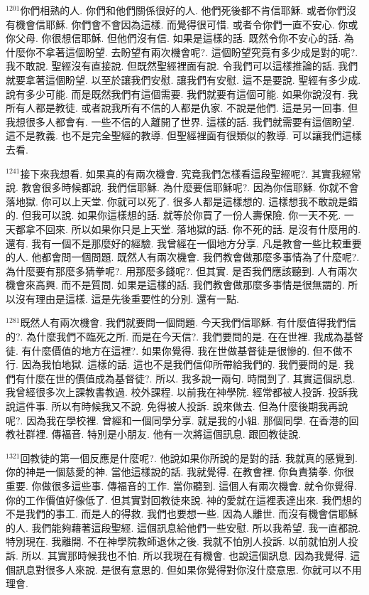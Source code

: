 \documentclass{book}
\begin{document}
$^{1201}$你們相熟的人.
你們和他們關係很好的人.
他們死後都不肯信耶穌.
或者你們沒有機會信耶穌.
你們會不會因為這樣.
而覺得很可惜.
或者令你們一直不安心.
你或你父母.
你很想信耶穌.
但他們沒有信.
如果是這樣的話.
既然令你不安心的話.
為什麼你不拿著這個盼望.
去盼望有兩次機會呢?.
這個盼望究竟有多少成是對的呢?.
我不敢說.
聖經沒有直接說.
但既然聖經裡面有說.
令我們可以這樣推論的話.
我們就要拿著這個盼望.
以至於讓我們安慰.
讓我們有安慰.
這不是要說.
聖經有多少成.
說有多少可能.
而是既然我們有這個需要.
我們就要有這個可能.
如果你說沒有.
我所有人都是教徒.
或者說我所有不信的人都是仇家.
不說是他們.
這是另一回事.
但我想很多人都會有.
一些不信的人離開了世界.
這樣的話.
我們就需要有這個盼望.
這不是教義.
也不是完全聖經的教導.
但聖經裡面有很類似的教導.
可以讓我們這樣去看.

$^{1241}$接下來我想看.
如果真的有兩次機會.
究竟我們怎樣看這段聖經呢?.
其實我經常說.
教會很多時候都說.
我們信耶穌.
為什麼要信耶穌呢?.
因為你信耶穌.
你就不會落地獄.
你可以上天堂.
你就可以死了.
很多人都是這樣想的.
這樣想我不敢說是錯的.
但我可以說.
如果你這樣想的話.
就等於你買了一份人壽保險.
你一天不死.
一天都拿不回來.
所以如果你只是上天堂.
落地獄的話.
你不死的話.
是沒有什麼用的.
還有.
我有一個不是那麼好的經驗.
我曾經在一個地方分享.
凡是教會一些比較重要的人.
他都會問一個問題.
既然人有兩次機會.
我們教會做那麼多事情為了什麼呢?.
為什麼要有那麼多猜拳呢?.
用那麼多錢呢?.
但其實.
是否我們應該聽到.
人有兩次機會來高興.
而不是質問.
如果是這樣的話.
我們教會做那麼多事情是很無謂的.
所以沒有理由是這樣.
這是先後重要性的分別.
還有一點.

$^{1281}$既然人有兩次機會.
我們就要問一個問題.
今天我們信耶穌.
有什麼值得我們信的?.
為什麼我們不臨死之所.
而是在今天信?.
我們要問的是.
在在世裡.
我成為基督徒.
有什麼價值的地方在這裡?.
如果你覺得.
我在世做基督徒是很慘的.
但不做不行.
因為我怕地獄.
這樣的話.
這也不是我們信仰所帶給我們的.
我們要問的是.
我們有什麼在世的價值成為基督徒?.
所以.
我多說一兩句.
時間到了.
其實這個訊息.
我曾經很多次上課教書教過.
校外課程.
以前我在神學院.
經常都被人投訴.
投訴我說這件事.
所以有時候我又不說.
免得被人投訴.
說來做去.
但為什麼後期我再說呢?.
因為我在學校裡.
曾經和一個同學分享.
就是我的小組.
那個同學.
在香港的回教社群裡.
傳福音.
特別是小朋友.
他有一次將這個訊息.
跟回教徒說.

$^{1321}$回教徒的第一個反應是什麼呢?.
他說如果你所說的是對的話.
我就真的感覺到.
你的神是一個慈愛的神.
當他這樣說的話.
我就覺得.
在教會裡.
你負責猜拳.
你很重要.
你做很多這些事.
傳福音的工作.
當你聽到.
這個人有兩次機會.
就令你覺得.
你的工作價值好像低了.
但其實對回教徒來說.
神的愛就在這裡表達出來.
我們想的不是我們的事工.
而是人的得救.
我們也要想一些.
因為人離世.
而沒有機會信耶穌的人.
我們能夠藉著這段聖經.
這個訊息給他們一些安慰.
所以我希望.
我一直都說.
特別現在.
我離開.
不在神學院教師退休之後.
我就不怕別人投訴.
以前就怕別人投訴.
所以.
其實那時候我也不怕.
所以我現在有機會.
也說這個訊息.
因為我覺得.
這個訊息對很多人來說.
是很有意思的.
但如果你覺得對你沒什麼意思.
你就可以不用理會.
\end{document}
